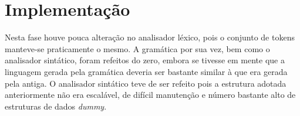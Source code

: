 \documentclass[
	article,			%
	11pt,				%
	oneside,			%
	a4paper,			%
	english,			%
	brazil,				%
	sumario=tradicional
	]{abntex2}
\renewcommand{\it}[1]{\textit{#1}}
\begin{document}

\section{Implementação}
\label{implementacao}

Nesta fase houve pouca alteração no analisador léxico, pois o conjunto de tokens manteve-se praticamente o mesmo. A gramática por sua vez, bem como o analisador sintático, foram refeitos do zero, 
embora se tivesse em mente que a linguagem gerada pela gramática deveria ser bastante similar à que era gerada pela antiga. O analisador sintático teve de ser refeito pois a estrutura adotada 
anteriormente não era escalável, de difícil manutenção e número bastante alto de estruturas de dados \it{dummy}.
\end{document}
